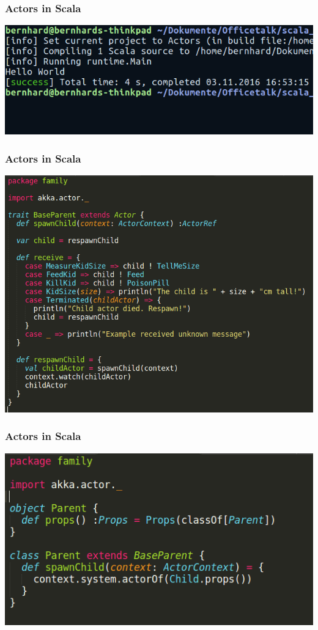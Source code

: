 \documentclass{beamer}
\begin{document}

\begin{frame}
\frametitle{Actors in Scala}
\includegraphics[width=1\linewidth]{./images/scala_example_terminal.png}
\end{frame}


\begin{frame}
\frametitle{Actors in Scala}
\includegraphics[width=0.8\linewidth]{./images/parent_trait.png}
\end{frame}


\begin{frame}
\frametitle{Actors in Scala}
\includegraphics[width=0.8\linewidth]{./images/parent_actor.png}
\end{frame}
\end{document}
